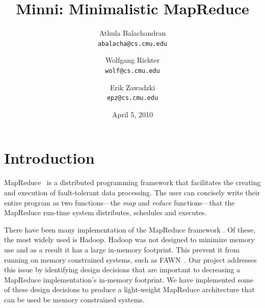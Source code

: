 \documentclass[10pt,letter,final,article,twocolumn]{article} %
\title{Minni: Minimalistic MapReduce}
\author{Athula Balachandran \\
{\tt abalacha@cs.cmu.edu}
\and
Wolfgang Richter \\
{\tt wolf@cs.cmu.edu}
\and
Erik Zawadzki \\
{\tt epz@cs.cmu.edu}}
\date{April 5, 2010} %
\begin{document}

\maketitle

\section{Introduction}
MapReduce~\citep{mapreduce08} is a distributed programming framework that facilitates the creating and execution of fault-tolerant data processing. The user can concisely write their entire program as two functions---the \emph{map} and \emph{reduce} functions---that the MapReduce run-time system distributes, schedules and executes. 

There have been many implementation of the MapReduce framework \citep{mochi,hadoop10,disco10,sphere09}. Of these, the most widely used is Hadoop. Hadoop was not designed to minimize memory use and as a result it has a large in-memory footprint. This prevent it from running on memory constrained systems, such as FAWN~\citep{fawn09}. Our project addresses this issue by identifying design decisions that are important to decreasing a MapReduce implementation's in-memory footprint. We have implemented some of these design decisions to produce a light-weight MapReduce architecture that can be used be memory constrained systems.


\end{document}
